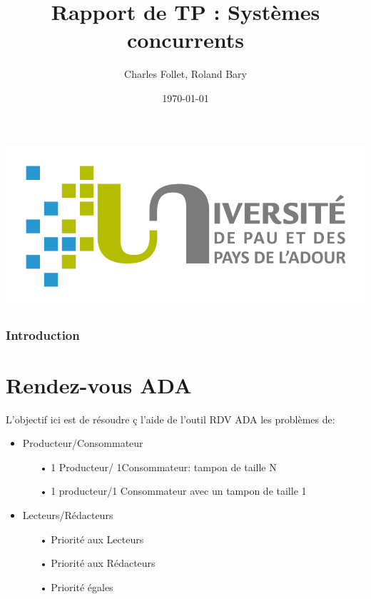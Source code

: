 \documentclass[11pt,a4paper]{article}
\title{\textbf{Rapport de TP : Systèmes concurrents}}
\author{Charles Follet, Roland Bary}
\date{\today}
\begin{document}
\maketitle
\begin{center}
\begin{center}
\includegraphics[scale=0.3]{logoUppa.png}
\end{center}
\end{center}
\thispagestyle{empty}
\newpage
\pagestyle{fancy}
\renewcommand{\contentsname}{Sommaire}
\tableofcontents
\newpage
\section*{Introduction}

\part{Rendez-vous ADA}
L'objectif ici est de résoudre ç l'aide de l'outil RDV ADA les problèmes de:
\begin{itemize}
\item Producteur/Consommateur
\begin{itemize}
\item[•]1 Producteur/ 1Consommateur: tampon de taille N
\item[•]1 producteur/1 Consommateur avec un tampon de taille 1
\end{itemize}
\item Lecteurs/Rédacteurs
\begin{itemize}
\item[•] Priorité aux Lecteurs
\item[•] Priorité aux Rédacteurs
\item[•] Priorité égales
\end{itemize}
\end{itemize}
\end{document}
